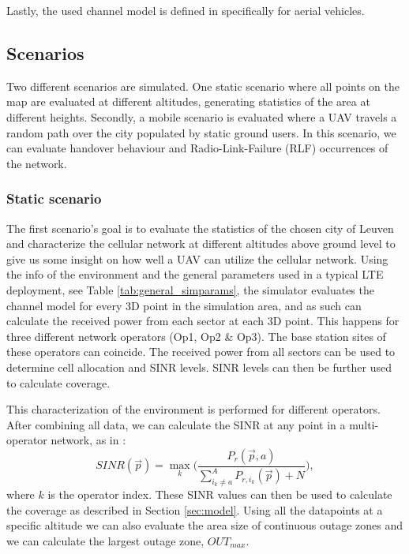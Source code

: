 \documentclass[conference,twocolumn,a4paper]{IEEEtran}
\begin{document}
\par Lastly, the used channel model is defined in \cite{3gpp2018enhanced} specifically for aerial vehicles.

\subsection{Scenarios}
\par Two different scenarios are simulated. One static scenario where all points on the map are evaluated at different altitudes, generating statistics of the area at different heights. Secondly, a mobile scenario is evaluated where a UAV travels a random path over the city populated by static ground users. In this scenario, we can evaluate handover behaviour and Radio-Link-Failure (RLF) occurrences of the network.

\subsubsection{Static scenario}

\par The first scenario's goal is to evaluate the statistics of the chosen city of Leuven and characterize the cellular network at different altitudes above ground level to give us some insight on how well a UAV can utilize the cellular network. Using the info of the environment and the general parameters used in a typical LTE deployment, see Table \ref{tab:general_simparams}, the simulator evaluates the channel model for every 3D point in the simulation area, and as such can calculate the received power from each sector at each 3D point. This happens for three different network operators (Op1, Op2 \& Op3). The base station sites of these operators can coincide. The received power from all sectors can be used to determine cell allocation and SINR levels. SINR levels can then be further used to calculate coverage.

\par This characterization of the environment is performed for different operators. After combining all data, we can calculate the SINR at any point in a multi-operator network, as in \cite{nguyen2017using}:
\begin{equation}
	\label{eq:sinr_max}
	SINR (\vec{p}) = \max\limits_{k}\Bigg(\frac{P_r(\vec{p},a)}{\sum^{A}_{i_k \neq a} P_{r, i_k}(\vec{p}) + N}\Bigg),
\end{equation}
where $k$ is the operator index. These SINR values can then be used to calculate the coverage as described in Section \ref{sec:model}. Using all the datapoints at a specific altitude we can also evaluate the area size of continuous outage zones and we can calculate the largest outage zone, $OUT_{max}$.
\end{document}
